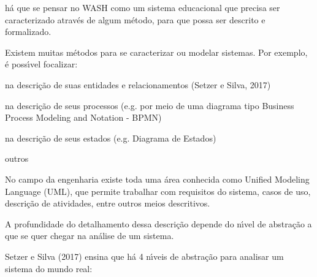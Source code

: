\documentclass[
12pt,		%
openright,	%
twoside,  %
a4paper,			%
chapter=TITLE,		%
english,			%
french,				%
spanish,			%
brazil				%
]{USPSC-classe/USPSC_RedarTex}
\begin{document}
\noindent\begin{center}\mbox{\centering{}}\end{center}


h\'a que se pensar no WASH como um sistema educacional que precisa ser caracterizado atrav\'es de algum m\'etodo, para que possa ser descrito e formalizado.










Existem muitas m\'etodos para se caracterizar ou modelar sistemas. Por exemplo, \'e poss\'{\i}vel focalizar:











\begin{alineas}
\item na descri\c{c}\~ao de suas entidades e relacionamentos  (Setzer e Silva, 2017)
\item na descri\c{c}\~ao de seus processos (e.g. por meio de uma diagrama tipo Business Process Modeling and Notation - BPMN)
\item na descri\c{c}\~ao de seus estados (e.g. Diagrama de Estados)
\item outros
\end{alineas}

No campo da engenharia existe toda uma \'area conhecida como Unified Modeling Language (UML), que permite trabalhar com requisitos do sistema, casos de uso, descri\c{c}\~ao de atividades, entre outros meios descritivos.










A profundidade do detalhamento dessa descri\c{c}\~ao depende do n\'{\i}vel de abstra\c{c}\~ao a que se quer chegar na an\'alise de um sistema.










Setzer e Silva (2017) ensina que h\'a 4 n\'{\i}veis de abstra\c{c}\~ao para analisar um sistema do mundo real:
\end{document}
